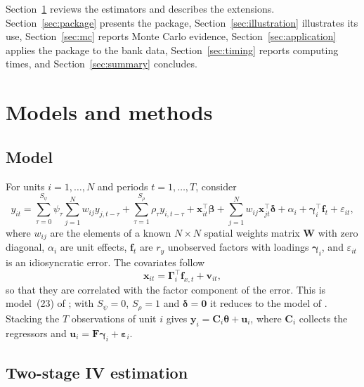 \documentclass[article]{jss}
\begin{document}
Section~\ref{sec:models} reviews the estimators and describes the
extensions. Section~\ref{sec:package} presents the package,
Section~\ref{sec:illustration} illustrates its use,
Section~\ref{sec:mc} reports Monte Carlo evidence,
Section~\ref{sec:application} applies the package to the bank data,
Section~\ref{sec:timing} reports computing times, and
Section~\ref{sec:summary} concludes.

\section{Models and methods} \label{sec:models}

\subsection{Model}

For units $i=1,\dots,N$ and periods $t=1,\dots,T$, consider
\begin{equation}
y_{it} = \sum_{\tau=0}^{S_\psi}\psi_\tau\sum_{j=1}^N w_{ij}y_{j,t-\tau}
       + \sum_{\tau=1}^{S_\rho}\rho_\tau y_{i,t-\tau}
       + \bm x_{it}^\top\bm\beta + \sum_{j=1}^N w_{ij}\bm x_{jt}^\top\bm\delta
       + \alpha_i + \bm\gamma_{i}^\top\bm f_{t} + \varepsilon_{it},
\label{eq:model}
\end{equation}
where $w_{ij}$ are the elements of a known $N\times N$ spatial weights
matrix $\bm W$ with zero diagonal, $\alpha_i$ are unit effects, $\bm f_t$
are $r_y$ unobserved factors with loadings $\bm\gamma_i$, and
$\varepsilon_{it}$ is an idiosyncratic error. The covariates follow
\begin{equation}
\bm x_{it} = \bm\Gamma_{i}^\top \bm f_{x,t} + \bm v_{it},
\label{eq:xdgp}
\end{equation}
so that they are correlated with the factor component of the error. This
is model~(23) of \citet{Kripfganz+Sarafidis:2025}; with $S_\psi=0$,
$S_\rho=1$ and $\bm\delta=\bm 0$ it reduces to the model of
\citet{Cui+Sarafidis+Yamagata:2023}. Stacking the $T$ observations of unit
$i$ gives $\bm y_i = \bm C_i\bm\theta + \bm u_i$, where $\bm C_i$ collects
the regressors and $\bm u_i = \bm F\bm\gamma_i + \bm\varepsilon_i$.

\subsection{Two-stage IV estimation}
\end{document}
